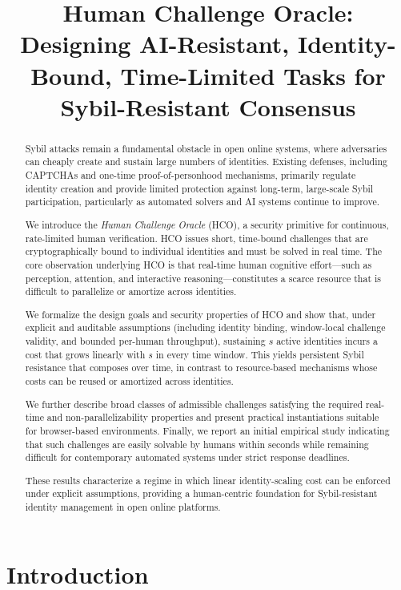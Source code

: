 \documentclass[11pt]{article}
\title{
	Human Challenge Oracle: Designing AI-Resistant, Identity-Bound, Time-Limited Tasks for Sybil-Resistant Consensus
}
\date{}
\newcommand{\HCO}{HCO\xspace}
\begin{document}
		
		\maketitle
		

		\begin{abstract}
			Sybil attacks remain a fundamental obstacle in open online systems, where adversaries can cheaply create and sustain large numbers of identities. Existing defenses, including CAPTCHAs and one-time proof-of-personhood mechanisms, primarily regulate identity creation and provide limited protection against long-term, large-scale Sybil participation, particularly as automated solvers and AI systems continue to improve.
			
			We introduce the \emph{Human Challenge Oracle} (\HCO), a security primitive for continuous, rate-limited human verification. \HCO issues short, time-bound challenges that are cryptographically bound to individual identities and must be solved in real time. The core observation underlying \HCO is that real-time human cognitive effort—such as perception, attention, and interactive reasoning—constitutes a scarce resource that is difficult to parallelize or amortize across identities.
			
			We formalize the design goals and security properties of \HCO and show that, under explicit and auditable assumptions (including identity binding, window-local challenge validity, and bounded per-human throughput), sustaining $s$ active identities incurs a cost that grows linearly with $s$ in every time window. This yields persistent Sybil resistance that composes over time, in contrast to resource-based mechanisms whose costs can be reused or amortized across identities.
			
			We further describe broad classes of admissible challenges satisfying the required real-time and non-parallelizability properties and present practical instantiations suitable for browser-based environments. Finally, we report an initial empirical study indicating that such challenges are easily solvable by humans within seconds while remaining difficult for contemporary automated systems under strict response deadlines.
			
			These results characterize a regime in which linear identity-scaling cost can be enforced under explicit assumptions, providing a human-centric foundation for Sybil-resistant identity management in open online platforms.
		\end{abstract}
	
\section{Introduction}
\end{document}
